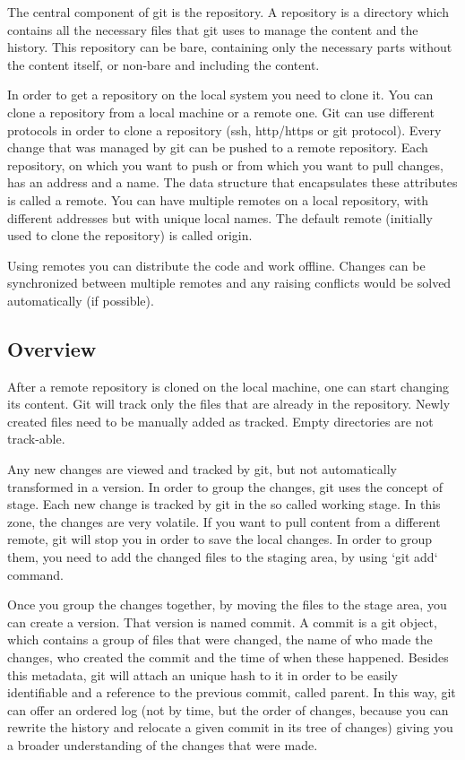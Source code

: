     The central component of git is the repository. A repository is a directory which contains all the necessary files that git uses to manage the content and the history. This repository can be bare, containing only the necessary parts without the content itself, or non-bare and including the content.

    In order to get a repository on the local system you need to clone it. You can clone a repository from a local machine or a remote one. Git can use different protocols in order to clone a repository (ssh, http/https or git protocol). Every change that was managed by git can be pushed to a remote repository. Each repository, on which you want to push or from which you want to pull changes, has an address and a name. The data structure that encapsulates these attributes is called a remote. You can have multiple remotes on a local repository, with different addresses but with unique local names. The default remote (initially used to clone the repository) is called origin.

    Using remotes you can distribute the code and work offline. Changes can be synchronized between multiple remotes and any raising conflicts would be solved automatically (if possible).

    \subsection{Overview}
        After a remote repository is cloned on the local machine, one can start changing its content. Git will track only the files that are already in the repository. Newly created files need to be manually added as tracked. Empty directories are not track-able.

        Any new changes are viewed and tracked by git, but not automatically transformed in a version. In order to group the changes, git uses the concept of stage. Each new change is tracked by git in the so called working stage. In this zone, the changes are very volatile. If you want to pull content from a different remote, git will stop you in order to save the local changes. In order to group them, you need to add the changed files to the staging area, by using `git add` command.

        Once you group the changes together, by moving the files to the stage area, you can create a version. That version is named commit. A commit is a git object, which contains a group of files that were changed, the name of who made the changes, who created the commit and the time of when these happened. Besides this metadata, git will attach an unique hash to it in order to be easily identifiable and a reference to the previous commit, called parent. In this way, git can offer an ordered log (not by time, but the order of changes, because you can rewrite the history and relocate a given commit in its tree of changes) giving you a broader understanding of the changes that were made.


